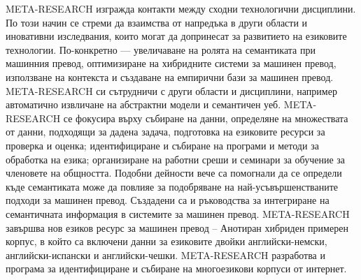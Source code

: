 \begin{multicols}{2}
META-RESEARCH изгражда контакти между сходни технологични дисциплини. По този начин се стреми да взаимства от напредъка в други области и иновативни изследвания, които могат да допринесат за развитието на езиковите технологии. 
По-конкретно — увеличаване на
 ролята на семантиката при машинния превод, оптимизиране на хибридните системи за машинен превод, използване на контекста и създаване на емпирични бази за машинен превод. META-RESEARCH си сътрудничи с други области и дисциплини, например автоматично извличане на абстрактни модели и семантичен уеб.
META-RESEARCH се фокусира върху събиране на данни, определяне на множествата от данни, подходящи за дадена задача, подготовка на езиковите ресурси за проверка и оценка; идентифициране и събиране на програми и методи за обработка на езика; организиране на работни среши и семинари за обучение за членовете на общността. Подобни дейности вече са помогнали да се определи къде семантиката може да повлияе за подобряване на най-усъвършенстваните подходи за машинен превод. Създадени са и ръководства за интегриране на семантичната
 информация в системите за машинен превод. META-RESEARCH завършва нов езиков ресурс за машинен превод – Анотиран хибриден примерен корпус, в който са включени данни за езиковите двойки английски-немски, английски-испански и английски-чешки.
META-RESEARCH разработва и програма за идентифициране и събиране на многоезикови корпуси от интернет.

\end{multicols}


\setcounter{section}{0}
\setcounter{figure}{0}

\cleardoublepage




